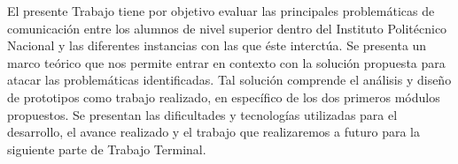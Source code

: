 El presente Trabajo tiene por objetivo evaluar las principales problemáticas de comunicación entre los alumnos de nivel superior dentro del Instituto Politécnico Nacional y las diferentes instancias con las que éste interctúa. 
Se presenta un marco teórico que nos permite entrar en contexto con la solución propuesta para atacar las problemáticas identificadas. Tal solución comprende el análisis y diseño de prototipos como trabajo realizado, en específico de los dos primeros módulos propuestos. Se presentan las dificultades y tecnologías utilizadas para el desarrollo, el avance realizado y el trabajo que realizaremos a futuro para la siguiente parte de Trabajo Terminal.

	
    
	
	
	 



